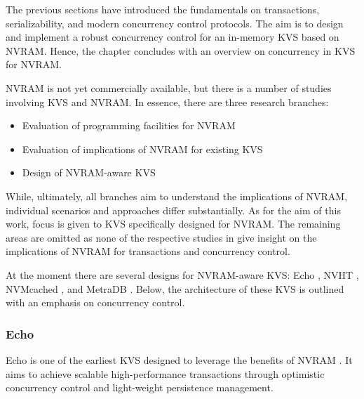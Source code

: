 The previous sections have introduced the fundamentals on transactions,
serializability, and modern concurrency control protocols. The aim is to design
and implement a robust concurrency control for an in-memory KVS based on NVRAM.
Hence, the chapter concludes with an overview on concurrency in KVS for NVRAM.

NVRAM is not yet commercially available, but there is a number of studies
involving KVS and NVRAM. In essence, there are three research branches:

\begin{itemize}
    \item Evaluation of programming facilities for NVRAM
    \item Evaluation of implications of NVRAM for existing KVS
    \item Design of NVRAM-aware KVS
\end{itemize}

While, ultimately, all branches aim to understand the implications of NVRAM,
individual scenarios and approaches differ substantially. As for the aim of this
work, focus is given to KVS specifically designed for NVRAM. The remaining areas
are omitted as none of the respective studies in
\cite{venkataraman2011consistent, pelley2013storage, volos2014aerie,
lersch2017analysis, malinowski2017using} give insight on the implications of
NVRAM for transactions and concurrency control.

At the moment there are several designs for NVRAM-aware KVS: Echo
\cite{bailey2013exploring}, NVHT \cite{zhou2016nvht}, NVMcached
\cite{wu2016nvmcached}, and MetraDB \cite{marmol2016nonvolatile}. Below, the
architecture of these KVS is outlined with an emphasis on concurrency control.

\subsubsection{Echo}

Echo is one of the earliest KVS designed to leverage the benefits of NVRAM
\cite{bailey2013exploring}. It aims to achieve scalable high-performance
transactions through optimistic concurrency control and light-weight persistence
management.

